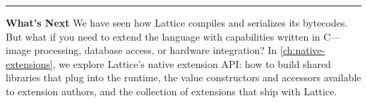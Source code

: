 \bigskip
\begin{center}\rule{0.5\linewidth}{0.4pt}\end{center}

\textbf{What's Next}\quad
We have seen how Lattice compiles and serializes its bytecodes. But what if you need to extend the language with capabilities written in C---image processing, database access, or hardware integration?
In \cref{ch:native-extensions}, we explore Lattice's native extension API: how to build shared libraries that plug into the runtime, the value constructors and accessors available to extension authors, and the collection of extensions that ship with Lattice.
